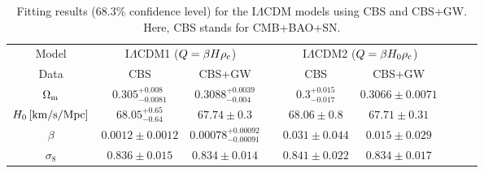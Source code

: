 \documentclass[aps,prd,nofootinbib,amsmath,amssymb,superscriptaddress,twocolumn,10pt]{revtex4}%
\begin{document}
\begin{table}\small
\setlength\tabcolsep{2pt}
\renewcommand{\arraystretch}{1.5}
\centering
\caption{\label{tab1}Fitting results (68.3\% confidence level) for the I$\Lambda$CDM models using CBS and CBS+GW. Here, CBS stands for CMB+BAO+SN.}
\begin{tabular}{ccccccccc}


\hline Model &\multicolumn{2}{c}{I$\Lambda$CDM1 ($Q=\beta H\rho_{\rm c}$)}&&\multicolumn{2}{c}{I$\Lambda$CDM2 ($Q=\beta H_{0}\rho_{\rm c}$)}\\
           \cline{2-3}\cline{5-6}
       Data  & CBS&CBS+GW &&CBS&CBS+GW \\

\hline
$\Omega_{\rm m}$                         &$0.305^{+0.008}_{-0.0081}$
                                         &$0.3088^{+0.0039}_{-0.004}$
                                         &&$0.3^{+0.015}_{-0.017}$
                                         &$0.3066\pm0.0071$
                                         \\

$H_0\,[{\rm km}/{\rm s}/{\rm Mpc}]$      &$68.05^{+0.65}_{-0.64}$
                                         &$67.74\pm0.3$
                                         &&$68.06\pm0.8$
                                         &$67.71\pm0.31$
                                         \\

$\beta$                                  &$0.0012\pm0.0012$
                                         &$0.00078^{+0.00092}_{-0.00091}$
                                         &&$0.031\pm0.044$
                                         &$0.015\pm0.029$
                                         \\

$\sigma_{8}$                             &$0.836\pm0.015$
                                         &$0.834\pm0.014$
                                         &&$0.841\pm0.022$
                                         &$0.834\pm0.017$
                                         \\



\hline
\end{tabular}

\end{table}
\end{document}
